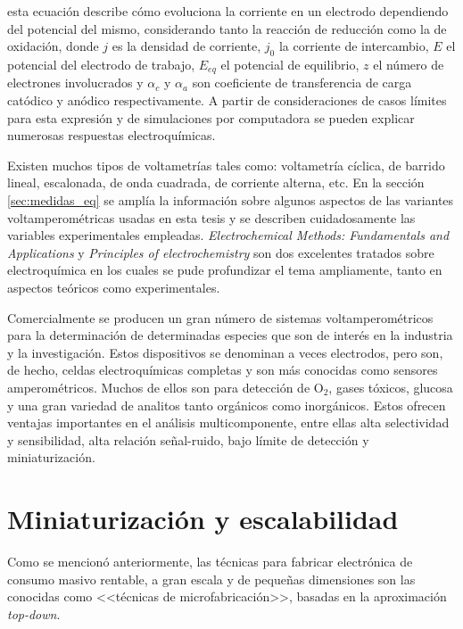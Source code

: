 		\noindent esta ecuación describe cómo evoluciona la corriente en un electrodo dependiendo del potencial del mismo, considerando tanto la reacción de reducción como la de oxidación, donde $j$ es la densidad de corriente, $j_0$ la corriente de intercambio, $E$ el potencial del electrodo de trabajo, $E_{eq}$ el potencial de equilibrio, $z$ el número de electrones involucrados y $\alpha_c$ y $\alpha_a$ son coeficiente de transferencia de carga catódico y anódico respectivamente. A partir de consideraciones de casos límites para esta expresión y de simulaciones por computadora se pueden explicar numerosas respuestas electroquímicas.

		Existen muchos tipos de voltametrías tales como: voltametría cíclica, de barrido lineal, escalonada, de onda cuadrada, de corriente alterna, etc. En la sección \ref{sec:medidas_eq} se amplía la información sobre algunos aspectos de las variantes voltamperométricas usadas en esta tesis y se describen cuidadosamente las variables experimentales empleadas. \textit{Electrochemical Methods: Fundamentals and Applications}\cite{Wi2000} y  \textit{Principles of electrochemistry}\cite{koryta1993} son dos excelentes tratados sobre electroquímica en los cuales se pude profundizar el tema ampliamente, tanto en aspectos teóricos como experimentales. 

		Comercialmente se producen un gran número de sistemas voltamperométricos para la determinación de determinadas especies que son de interés en la industria y la investigación. Estos dispositivos se denominan a veces electrodos, pero son, de hecho, celdas electroquímicas completas y son más conocidas como sensores amperométricos. Muchos de ellos son para detección de O$_2$, gases tóxicos, glucosa y una gran variedad de analitos tanto orgánicos como inorgánicos. Estos ofrecen ventajas importantes en el análisis multicomponente, entre ellas alta selectividad y sensibilidad, alta relación señal-ruido, bajo límite de detección y miniaturización.\cite{bakker2006,stradiotto2003,harris2013,Ciosek2007,Kojima2003}
			
\section{Miniaturización y escalabilidad}\label{sec:microfabricacion}\label{sec:intro_fotolito}
		
		Como se mencionó anteriormente, las técnicas para fabricar electrónica de consumo masivo rentable, a gran escala y de pequeñas dimensiones son las conocidas como <<técnicas de microfabricación>>, basadas en la aproximación \textit{top-down}. \cite{Jaeger2001}

